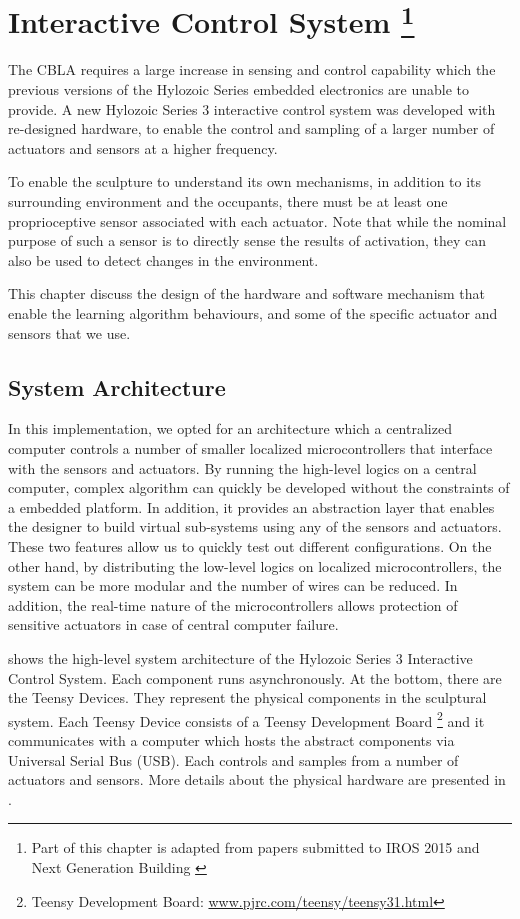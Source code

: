 \chapter[Interactive Control System]
{Interactive Control System 
	\footnote{Part of this chapter is adapted from papers submitted to IROS 2015 \cite{Chan2015} and Next Generation Building \cite{Gorbet2015}}} 
\label{chap:ctrl_system}

The CBLA requires a large increase in sensing and control capability which the previous versions of the Hylozoic Series embedded electronics \cite{Beesley2007.book} are unable to provide. A new Hylozoic Series 3 interactive control system was developed with re-designed hardware, to enable the control and sampling of a larger number of actuators and sensors at a higher frequency. 

To enable the sculpture to understand its own mechanisms, in addition to its surrounding environment and the occupants, there must be at least one proprioceptive sensor associated with each actuator. Note that while the nominal purpose of such a sensor is to directly sense the results of activation, they can also be used to detect changes in the environment.

This chapter discuss the design of the hardware and software mechanism that enable the learning algorithm behaviours, and some of the specific actuator and sensors that we use. 


\section{System Architecture}

In this implementation, we opted for an architecture which a centralized computer controls a number of smaller localized microcontrollers that interface with the sensors and actuators. By running the high-level logics on a central computer, complex algorithm can quickly be developed without the constraints of a embedded platform. In addition, it provides an abstraction layer that enables the designer to build virtual sub-systems using any of the sensors and actuators. These two features allow us to quickly test out different configurations. On the other hand, by distributing the low-level logics on localized microcontrollers, the system can be more modular and the number of wires can be reduced. In addition, the real-time nature of the microcontrollers allows protection of sensitive actuators in case of central computer failure. 

 shows the high-level system architecture of the Hylozoic Series 3 Interactive Control System. Each component runs asynchronously. At the bottom, there are the Teensy Devices. They represent the physical components in the sculptural system. Each Teensy Device consists of a Teensy Development Board \footnote{Teensy Development Board: \url{www.pjrc.com/teensy/teensy31.html}} and it communicates with a computer which hosts the abstract components via Universal Serial Bus (USB). Each controls and samples from a number of actuators and sensors. More details about the physical hardware are presented in . 

